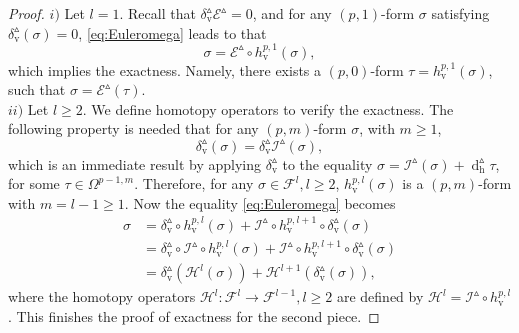 \documentclass[11pt]{article} %
\numberwithin{equation}{section}
\newcommand{\upd}{\operatorname{d}}
\newcommand{\uph}{\operatorname{h}}
\newcommand{\upv}{\operatorname{v}}
\newcommand{\mcE}{\mathcal{E}}
\newcommand{\mcI}{\mathcal{I}}
\newcommand{\mcH}{\mathcal{H}}
\newcommand{\dDh}{\upd^{\vartriangle}_{\uph}}
\theoremstyle{plain}
\theoremstyle{definition}
\begin{document}
\begin{proof}
$i)$ Let $l=1$. Recall that $\delta^{\vartriangle}_{\upv}\mcE^{\vartriangle}=0$, and for any $(p,1)$-form $\sigma$ satisfying
$\delta^{\vartriangle}_{\upv}(\sigma)=0$, \eqref{eq:Euleromega}
leads to that
\begin{equation}
\sigma=\mcE^{\vartriangle}\circ
h_{\upv}^{p,1}(\sigma),
\end{equation}
which implies the exactness. Namely, there exists a $(p,0)$-form
$\tau=h_{\upv}^{p,1}(\sigma)$,
such that $\sigma=\mcE^{\vartriangle}(\tau)$.\\
$ii)$ Let $l\geq2$.  We define homotopy operators to verify the exactness. The
following property is needed that for any $(p,m)$-form $\sigma$,
with $m\geq1$,
\begin{equation}
\delta^{\vartriangle}_{\upv}(\sigma)=
\delta^{\vartriangle}_{\upv}\mcI^{\vartriangle}(\sigma),
\end{equation}
which is an immediate result by applying
$\delta^{\vartriangle}_{\upv}$ to the equality
$\sigma=\mcI^{\vartriangle}(\sigma)+\dDh\!\tau$,
for some $\tau\in\Omega^{p-1,m}$. Therefore, for any
$\sigma\in\mathscr{F}^l,l\geq2$,
$h_{\upv}^{p,l}(\sigma)$ is a $(p,m)$-form with
$m=l-1\geq1$. Now the equality \eqref{eq:Euleromega} becomes 
\begin{equation}
\begin{aligned}
\sigma&=\delta^{\vartriangle}_{\upv}\circ
h_{\upv}^{p,l}(\sigma)
+\mcI^{\vartriangle}\circ h_{\upv}^{p,l+1}\circ\delta^{\vartriangle}_{\upv}(\sigma)\\
&=\delta^{\vartriangle}_{\upv}\circ\mcI^{\vartriangle}\circ
h_{\upv}^{p,l}(\sigma)
+\mcI^{\vartriangle}\circ h_{\upv}^{p,l+1}\circ\delta^{\vartriangle}_{\upv}(\sigma)\\
&=\delta^{\vartriangle}_{\upv}\left(\mcH^l(\sigma)\right)
+\mcH^{l+1}\left(\delta^{\vartriangle}_{\upv}(\sigma)\right),
\end{aligned}
\end{equation}
where the homotopy operators
$\mcH^l:\mathscr{F}^{l}\rightarrow\mathscr{F}^{l-1},l\geq2$
are defined by $\mcH^l=\mcI^{\vartriangle}\circ
h_{\upv}^{p,l}$. This finishes the proof of exactness
for the second piece.
\end{proof}

\end{document}
